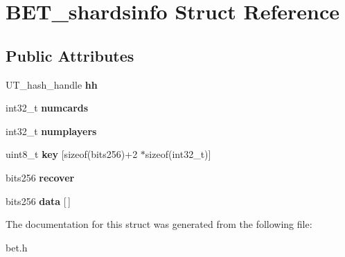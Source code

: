 \hypertarget{structBET__shardsinfo}{}\section{B\+E\+T\+\_\+shardsinfo Struct Reference}
\label{structBET__shardsinfo}
\subsection*{Public Attributes}
\begin{DoxyCompactItemize}
\item 
\mbox{\label{structBET__shardsinfo_a6553a2f82e2eaa698bc743d7214cacca}} 
U\+T\+\_\+hash\+\_\+handle {\bfseries hh}
\item 
\mbox{\label{structBET__shardsinfo_a51fbef7e339f923d13381b8e302defe2}} 
int32\+\_\+t {\bfseries numcards}
\item 
\mbox{\label{structBET__shardsinfo_a0873504d0f2c17a1a4e6983e62903857}} 
int32\+\_\+t {\bfseries numplayers}
\item 
\mbox{\label{structBET__shardsinfo_aa90bedeb796a7940ff452191c5405a31}} 
uint8\+\_\+t {\bfseries key} \mbox{[}sizeof(bits256)+2 $\ast$sizeof(int32\+\_\+t)\mbox{]}
\item 
\mbox{\label{structBET__shardsinfo_a293358259dce8c51fbdeaf1b6323e495}} 
bits256 {\bfseries recover}
\item 
\mbox{\label{structBET__shardsinfo_ac11f71d5b02d8113ab4c2764505deca0}} 
bits256 {\bfseries data} \mbox{[}$\,$\mbox{]}
\end{DoxyCompactItemize}


The documentation for this struct was generated from the following file\+:\begin{DoxyCompactItemize}
\item 
bet.\+h\end{DoxyCompactItemize}
